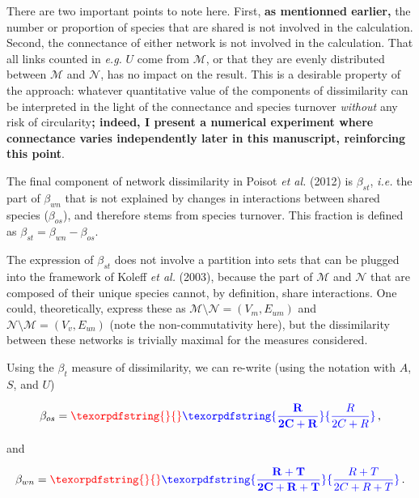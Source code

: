 \documentclass[11pt]{article}
\makeatletter
\def\maxwidth{\ifdim\Gin@nat@width>\linewidth\linewidth
\else\Gin@nat@width\fi}
\let\Oldincludegraphics\includegraphics
\renewcommand{\includegraphics}[1]{\Oldincludegraphics[width=\maxwidth]{#1}}
\providecommand{\DIFaddtex}[1]{{\bf #1}} %
\providecommand{\DIFdeltex}[1]{} %
\providecommand{\DIFaddbegin}{\protect\color{blue}} %
\providecommand{\DIFaddend}{\protect\color{black}} %
\providecommand{\DIFdelbegin}{\protect\color{red}} %
\providecommand{\DIFdelend}{\protect\color{black}} %
\providecommand{\DIFadd}[1]{\texorpdfstring{\DIFaddtex{#1}}{#1}} %
\providecommand{\DIFdel}[1]{\texorpdfstring{\DIFdeltex{#1}}{}} %
\newcommand{\DIFscaledelfig}{0.5}
\newlength{\DIFdelgraphicswidth} %
\newlength{\DIFdelgraphicsheight} %
\newcommand{\DIFaddincludegraphics}[2][]{{\color{blue}\fbox{\DIFOincludegraphics[#1]{#2}}}} %
\newcommand{\DIFdelincludegraphics}[2][]{%
\sbox{\DIFdelgraphicsbox}{\DIFOincludegraphics[#1]{#2}}%
\settoboxwidth{\DIFdelgraphicswidth}{\DIFdelgraphicsbox} %
\settoboxtotalheight{\DIFdelgraphicsheight}{\DIFdelgraphicsbox} %
\scalebox{\DIFscaledelfig}{%
\parbox[b]{\DIFdelgraphicswidth}{\usebox{\DIFdelgraphicsbox}\\[-\baselineskip] \rule{\DIFdelgraphicswidth}{0em}}\llap{\resizebox{\DIFdelgraphicswidth}{\DIFdelgraphicsheight}{%
\setlength{\unitlength}{\DIFdelgraphicswidth}%
\begin{picture}(1,1)%
\thicklines\linethickness{2pt} %
{\color[rgb]{1,0,0}\put(0,0){\framebox(1,1){}}}%
{\color[rgb]{1,0,0}\put(0,0){\line( 1,1){1}}}%
{\color[rgb]{1,0,0}\put(0,1){\line(1,-1){1}}}%
\end{picture}%
}\hspace*{3pt}}} %
} %
\DeclareRobustCommand{\DIFaddbegin}{\DIFOaddbegin \let\includegraphics\DIFaddincludegraphics} %
\DeclareRobustCommand{\DIFaddend}{\DIFOaddend \let\includegraphics\DIFOincludegraphics} %
\DeclareRobustCommand{\DIFdelbegin}{\DIFOdelbegin \let\includegraphics\DIFdelincludegraphics} %
\DeclareRobustCommand{\DIFdelend}{\DIFOaddend \let\includegraphics\DIFOincludegraphics} %
\makeatother
\begin{document}
There are two important points to note here. First, \DIFaddbegin \DIFadd{as mentionned
earlier, }\DIFaddend the number or proportion of species that are shared is not
involved in the calculation. Second, the connectance of either network
is not involved in the calculation. That all links counted in
\emph{e.g.} \(U\) come from \(\mathcal{M}\), or that they are evenly
distributed between \(\mathcal{M}\) and \(\mathcal{N}\), has no impact
on the result. This is a desirable property of the approach: whatever
quantitative value of the components of dissimilarity can be interpreted
in the light of the connectance and species turnover \emph{without} any
risk of circularity\DIFdelbegin \DIFdel{.
Therefore the argument of Fründ (2021), whereby the \(\beta_{os}\)
component should decrease with turnover, and be invariant to
connectance , does not hold: the very pointof the approach is to provide
measures that can be interpreted in the light of connectance and species
turnover}\DIFdelend \DIFaddbegin \DIFadd{; indeed, I present a numerical experiment where
connectance varies independently later in this manuscript, reinforcing
this point}\DIFaddend .

The final component of network dissimilarity in Poisot \emph{et al.}
(2012) is \(\beta_{st}\), \emph{i.e.} the part of \(\beta_{wn}\) that is
not explained by changes in interactions between shared species
(\(\beta_{os}\)), and therefore stems from species turnover. This
fraction is defined as \(\beta_{st} = \beta_{wn}-\beta_{os}\). \DIFdelbegin %

\DIFdelend The
expression of \(\beta_{st}\) does not involve a partition into sets that
can be plugged into the framework of Koleff \emph{et al.} (2003),
because the part of \(\mathcal{M}\) and \(\mathcal{N}\) that are
composed of their unique species cannot, by definition, share
interactions. One could, theoretically, express these as
\(\mathcal{M} \setminus \mathcal{N} = (V_m, E_{um})\) and
\(\mathcal{N} \setminus \mathcal{M} = (V_v, E_{un})\) (note the
non-commutativity here), but the dissimilarity between these networks is
trivially maximal for the measures considered.

Using the \(\beta_t\) measure of dissimilarity, we can re-write (using
the notation with \(A\), \(S\), and \(U\))

\[\beta_{os} = \DIFdelbegin \DIFdel{\frac{S}{2A+S}}\DIFdelend \DIFaddbegin \DIFadd{\frac{R}{2C+R}}\DIFaddend \,,\]

and

\[\beta_{wn} = \DIFdelbegin \DIFdel{\frac{S+U}{2A+S+U}}\DIFdelend \DIFaddbegin \DIFadd{\frac{R+T}{2C+R+T}}\DIFaddend \,.\]
\end{document}
